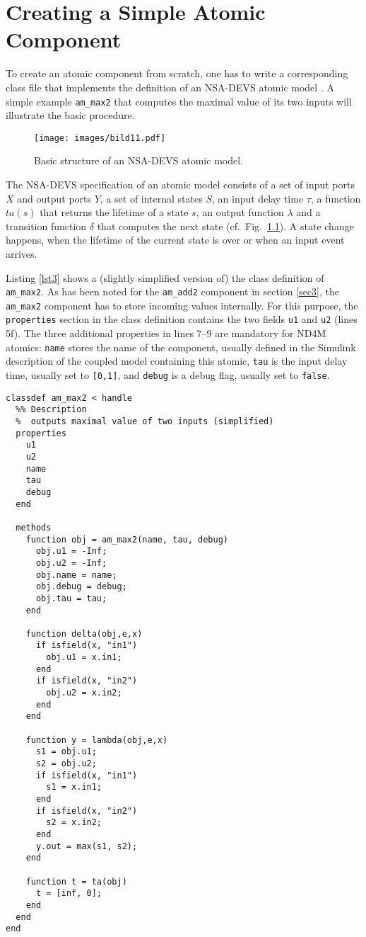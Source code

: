 \documentclass[12pt,oneside,a4paper,bibtotoc,BCOR=0pt,DIV=20]{scrreprt}
\newcommand{\cft}[1]{\mbox{\texttt{#1}}}   %
\begin{document}
\chapter{Creating a Simple Atomic Component} \label{sec7}

To create an atomic component from scratch, one has to write a corresponding
class file that implements the definition of an NSA-DEVS atomic model
\cite{nsaSimulator2}. A simple example \cft{am\_max2} that computes the maximal
value of its two inputs will illustrate the basic procedure.

\begin{figure}[ht]
\centering
\texttt{[image: images/bild11.pdf]}
\caption{Basic structure of an NSA-DEVS atomic model.}
\label{fig_11}
\end{figure}

The NSA-DEVS specification of an atomic model consists of a set of input ports
$X$ and output ports $Y$, a set of internal states $S$, an input delay time
$\tau$, a function $ta(s)$ that returns the lifetime of a state $s$, an output
function $\lambda$ and a transition function $\delta$ that computes the next
state (cf.\ Fig.\ \ref{fig_11}). A state change happens, when the lifetime of
the current state is over or when an input event arrives.

Listing \ref{lst3} shows a (slightly simplified version of) the class
definition of \cft{am\_max2}. As has been noted for the \cft{am\_add2}
component in section \ref{sec3}, the \cft{am\_max2} component has to store
incoming values internally. For this purpose, the \cft{properties} section in
the class definition contains the two fields \cft{u1} and \cft{u2} (lines
5f). The three additional properties in lines 7--9 are mandatory for ND4M
atomics: \cft{name} stores the name of the component, usually defined in the
Simulink description of the coupled model containing this atomic, \cft{tau} is
the input delay time, usually set to \cft{[0,1]}, and \cft{debug} is a debug
flag, usually set to \cft{false}.

\begin{lstlisting}[caption={Simplified code of \cft{am\_max2.m}.},captionpos=b,label=lst3]
classdef am_max2 < handle
  %% Description
  %  outputs maximal value of two inputs (simplified)
  properties
    u1
    u2
    name
    tau
    debug
  end

  methods
    function obj = am_max2(name, tau, debug)
      obj.u1 = -Inf;
      obj.u2 = -Inf;
      obj.name = name;
      obj.debug = debug;
      obj.tau = tau;
    end

    function delta(obj,e,x)
      if isfield(x, "in1")
        obj.u1 = x.in1;
      end
      if isfield(x, "in2")
        obj.u2 = x.in2;
      end
    end

    function y = lambda(obj,e,x)
      s1 = obj.u1;
      s2 = obj.u2;
      if isfield(x, "in1")
        s1 = x.in1;
      end
      if isfield(x, "in2")
        s2 = x.in2;
      end
      y.out = max(s1, s2);
    end

    function t = ta(obj)
      t = [inf, 0];
    end
  end
end
\end{lstlisting}
\end{document}
